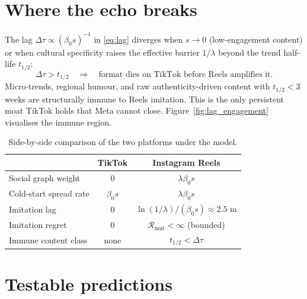 \documentclass[12pt,a4paper]{article}
\begin{document}
\section{Where the echo breaks}
\label{sec:break}

The lag $\Delta\tau \propto (\beta_0 s)^{-1}$ in \eqref{eq:lag} diverges when $s \to 0$ (low-engagement content) or when cultural specificity raises the effective barrier $1/\lambda$ beyond the trend half-life $t_{1/2}$:
\begin{equation}
  \Delta\tau > t_{1/2} \quad \Longrightarrow \quad \text{format dies on TikTok before Reels amplifies it.}
  \label{eq:break}
\end{equation}
Micro-trends, regional humour, and raw authenticity-driven content with $t_{1/2} < 3$ weeks are structurally immune to Reels imitation. This is the only persistent moat TikTok holds that Meta cannot close. Figure~\ref{fig:lag_engagement} visualises the immune region.

\begin{table}[h]
\centering
\begin{tabular}{lcc}
\toprule
                              & TikTok        & Instagram Reels                    \\ \midrule
Social graph weight           & $0$           & $\lambda \beta_0 s$                \\
Cold-start spread rate        & $\beta_0 s$   & $\lambda \beta_0 s$                \\
Imitation lag                 & $0$           & $\ln(1/\lambda) / (\beta_0 s) \approx 2.5$ m \\
Imitation regret              & $0$           & $\mathcal{R}_{\text{imit}} < \infty$ (bounded) \\
Immune content class          & none          & $t_{1/2} < \Delta\tau$             \\ \bottomrule
\end{tabular}
\caption{Side-by-side comparison of the two platforms under the model.}
\label{tab:compare}
\end{table}

\section{Testable predictions}
\label{sec:predictions}
\end{document}
